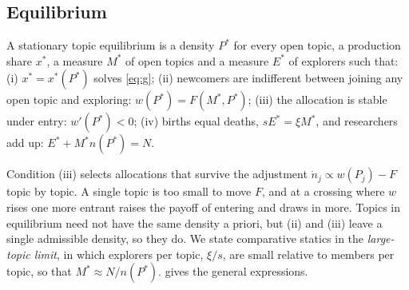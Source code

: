 \subsection{Equilibrium}

\begin{definition}\label{def:eq}
A stationary topic equilibrium is a density $P^*$ for every open topic, a
production share $x^*$, a measure $M^*$ of open topics and a measure $E^*$ of
explorers such that:
(i) $x^*=x^*(P^*)$ solves \eqref{eq:g};
(ii) newcomers are indifferent between joining any open topic and exploring:
$w(P^*)=F(M^*,P^*)$;
(iii) the allocation is stable under entry: $w'(P^*)<0$;
(iv) births equal deaths, $sE^*=\xi M^*$, and researchers add up: $E^*+M^*n(P^*)=N$.
\end{definition}

Condition (iii) selects allocations that survive the adjustment
$\dot n_j\propto w(P_j)-F$ topic by topic. A single topic is too small to move
$F$, and at a crossing where $w$ rises one more entrant raises the payoff of
entering and draws in more. Topics in equilibrium need not have the same
density a priori, but (ii) and (iii) leave a single admissible density, so they
do. We state comparative statics in the \emph{large-topic limit}, in which
explorers per topic, $\xi/s$, are small relative to members per topic, so that
$M^*\approx N/n(P^*)$.  gives the general expressions.
